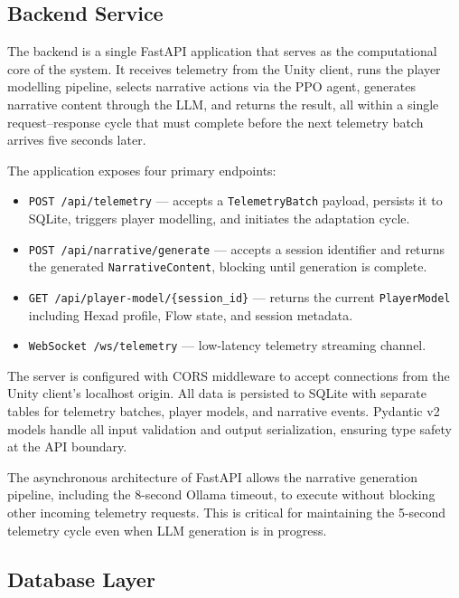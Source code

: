 \subsection{Backend Service}

The backend is a single FastAPI application that serves as the computational core of the system. It receives telemetry from the Unity client, runs the player modelling pipeline, selects narrative actions via the PPO agent, generates narrative content through the LLM, and returns the result, all within a single request--response cycle that must complete before the next telemetry batch arrives five seconds later.

The application exposes four primary endpoints:

\begin{itemize}
\item \texttt{POST /api/telemetry} --- accepts a \texttt{TelemetryBatch} payload, persists it to SQLite, triggers player modelling, and initiates the adaptation cycle.
\item \texttt{POST /api/narrative/generate} --- accepts a session identifier and returns the generated \texttt{NarrativeContent}, blocking until generation is complete.
\item \texttt{GET /api/player-model/\{session\_id\}} --- returns the current \texttt{PlayerModel} including Hexad profile, Flow state, and session metadata.
\item \texttt{WebSocket /ws/telemetry} --- low-latency telemetry streaming channel.
\end{itemize}

The server is configured with CORS middleware to accept connections from the Unity client's localhost origin. All data is persisted to SQLite with separate tables for telemetry batches, player models, and narrative events. Pydantic v2 models handle all input validation and output serialization, ensuring type safety at the API boundary.

The asynchronous architecture of FastAPI allows the narrative generation pipeline, including the 8-second Ollama timeout, to execute without blocking other incoming telemetry requests. This is critical for maintaining the 5-second telemetry cycle even when LLM generation is in progress.

\subsection{Database Layer}

